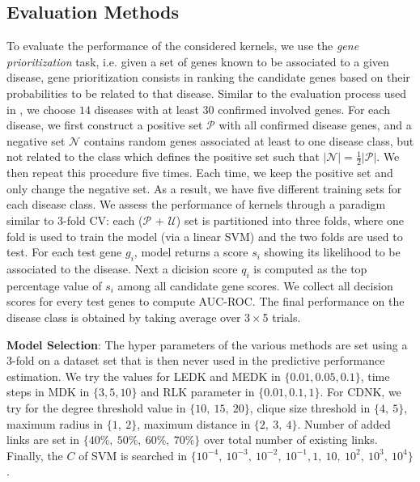 \subsection{Evaluation Methods}
To evaluate the performance of the considered kernels, we use the {\em gene prioritization} task, i.e. given a set of genes known to be associated to a given disease, gene prioritization consists in ranking the candidate genes based on their probabilities to be related to that disease. Similar to the evaluation process used in \cite{proceeding3}, we choose $14$ diseases with at least $30$ confirmed involved genes. For each disease, we first construct a positive set $\mathcal{P}$ with all confirmed disease genes, and a negative set $\mathcal{N}$ contains random genes associated at least to one disease class, but not related to the class which defines the positive set such that $\vert \mathcal{N} \vert = \frac{1}{2} \vert \mathcal{P} \vert$. We then repeat this procedure five times. Each time, we keep the positive set and only change the negative set. As a result, we have five different training sets for each disease class. We assess the performance of kernels through a paradigm similar to 3-fold CV: each ($\mathcal{P}$ + $\mathcal{U}$) set is partitioned into three folds, where one fold is used to train the model (via a linear SVM) and the two folds are used to test. For each test gene $g_i$, model returns a score $s_i$ showing its likelihood to be associated to the disease. Next a dicision score $q_i$ is computed as the top percentage value of $s_i$ among all candidate gene scores. We collect all decision scores for every test genes to compute AUC-ROC. The final performance on the disease class is obtained by taking average over $3\times$5 trials.

\textbf{Model Selection}: The hyper parameters of the various methods are set using a 3-fold on a dataset set that is then never used in the predictive performance estimation. We try the values for LEDK and MEDK in $\lbrace  0.01, 0.05, 0.1 \rbrace$, time steps in MDK in $\lbrace 3, 5, 10 \rbrace$ and RLK parameter in $\lbrace 0.01, 0.1, 1 \rbrace$. For CDNK, we try for the degree threshold value in $\lbrace 10,\ 15,\ 20 \rbrace$, clique size threshold in $\lbrace 4,\ 5 \rbrace$, maximum radius in $\lbrace 1,\ 2 \rbrace$, maximum distance in $\lbrace 2,\ 3,\ 4 \rbrace$. Number of added links are set in $\lbrace 40\%,\ 50\%,\ 60\%,\ 70\% \rbrace$ over total number of existing links. Finally, the $C$ of SVM is searched in $\lbrace 10^{-4},  \ 10^{-3}, \ 10^{-2},\ 10^{-1}, 1,\ 10,\ 10^2, \ 10^3,\ 10^4 \rbrace$.
